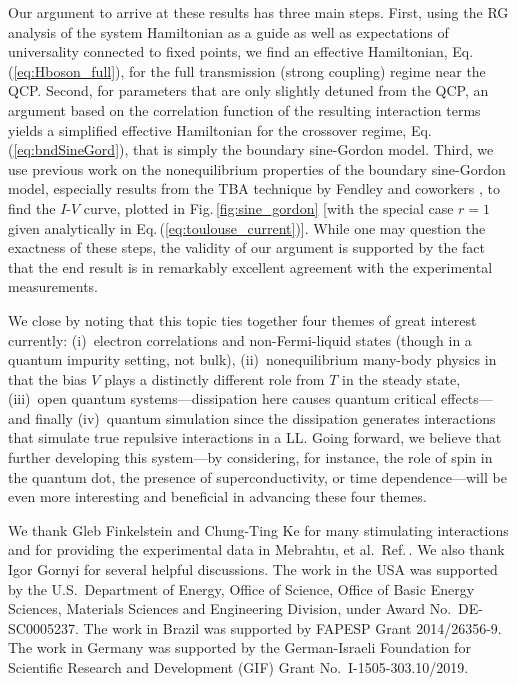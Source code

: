 \documentclass[aps,prb,reprint,floatfix,superscriptaddress,amssymb,amsmath]{revtex4-2}
\begin{document}
Our argument to arrive at these results has three main steps.
First, using the RG analysis of the system Hamiltonian as a guide as well as expectations of universality connected to fixed points, we find an effective Hamiltonian, Eq.\,(\ref{eq:Hboson_full}), for the full transmission (strong coupling) regime near the QCP. 
Second, for parameters that are only slightly detuned from the QCP, an argument based on the correlation function of the resulting interaction terms \cite{GiamarchiBook} yields a simplified effective Hamiltonian for the crossover regime, Eq.\,(\ref{eq:bndSineGord}), that is simply the boundary sine-Gordon model. 
Third, we use previous work on the nonequilibrium properties of the boundary sine-Gordon model, especially results from the TBA technique by Fendley and coworkers \cite{FendleySaleurWarnerNPB94,FendleyPRB95}, to find the $I$-$V$ curve, plotted in Fig.\,\ref{fig:sine_gordon} [with the special case $r\!=\!1$ given analytically in Eq.\,(\ref{eq:toulouse_current})].
While one may question the exactness of these steps, the validity of our argument is supported by the fact that the end result is in remarkably excellent agreement with the experimental measurements. 

We close by noting that this topic ties together four themes of great interest currently:
(i)~electron correlations and non-Fermi-liquid states (though in a quantum impurity setting, not bulk), 
(ii)~nonequilibrium many-body physics in that the bias $V$ plays a distinctly different role from $T$ in the steady state, 
(iii)~open quantum systems---dissipation here causes quantum critical effects---and finally 
(iv)~quantum simulation since the dissipation generates interactions that simulate true repulsive interactions in a LL. Going forward, we believe that further developing this system---by considering, for instance, the role of spin in the quantum dot, the presence of superconductivity, or time dependence---will be even more interesting and beneficial in advancing these four themes. 


\begin{acknowledgments}
We thank Gleb Finkelstein and Chung-Ting Ke  for many stimulating interactions and for providing the experimental data in Mebrahtu, et al.\ Ref.\,\cite{Mebrahtu13}. We also thank Igor Gornyi for several  helpful discussions. 
The work in the USA was supported by the U.S.\ Department of Energy, Office of Science, Office of Basic Energy Sciences, Materials Sciences and Engineering Division, under Award No.\ DE-SC0005237.
The work in Brazil was supported by FAPESP Grant 2014/26356-9. 
The work in Germany was supported by the German-Israeli Foundation for Scientific Research and Development (GIF) Grant No.\ I-1505-303.10/2019. 
\end{acknowledgments}
\end{document}
